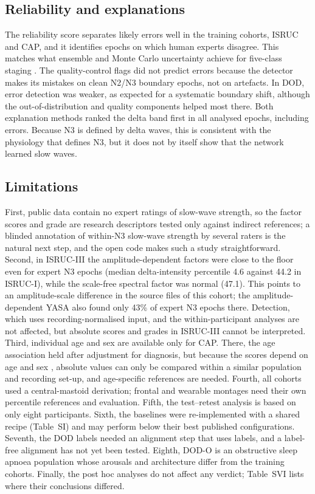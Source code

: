 \subsection{Reliability and explanations}
The reliability score separates likely errors well in the training cohorts, ISRUC and CAP, and it identifies epochs on which human experts disagree. This matches what ensemble and Monte Carlo uncertainty achieve for five-class staging \cite{dei2025sleepyland,vainikka2026uncertainty}. The quality-control flags did not predict errors because the detector makes its mistakes on clean N2/N3 boundary epochs, not on artefacts. In DOD, error detection was weaker, as expected for a systematic boundary shift, although the out-of-distribution and quality components helped most there. Both explanation methods ranked the delta band first in all analysed epochs, including errors. Because N3 is defined by delta waves, this is consistent with the physiology that defines N3, but it does not by itself show that the network learned slow waves. %

\subsection{Limitations}
\label{sec:limitations}
First, public data contain no expert ratings of slow-wave strength, so the factor scores and grade are research descriptors tested only against indirect references; a blinded annotation of within-N3 slow-wave strength by several raters is the natural next step, and the open code makes such a study straightforward. Second, in ISRUC-III the amplitude-dependent factors were close to the floor even for expert N3 epochs (median delta-intensity percentile 4.6 against 44.2 in ISRUC-I), while the scale-free spectral factor was normal (47.1). This points to an amplitude-scale difference in the source files of this cohort; the amplitude-dependent YASA also found only 43\% of expert N3 epochs there. Detection, which uses recording-normalised input, and the within-participant analyses are not affected, but absolute scores and grades in ISRUC-III cannot be interpreted. Third, individual age and sex are available only for CAP. There, the age association held after adjustment for diagnosis, but because the scores depend on age and sex \cite{davidson2025n3,rosinvil2021age}, absolute values can only be compared within a similar population and recording set-up, and age-specific references are needed. Fourth, all cohorts used a central-mastoid derivation; frontal and wearable montages need their own percentile references and evaluation. Fifth, the test--retest analysis is based on only eight participants. Sixth, the baselines were re-implemented with a shared recipe (Table~SI) and may perform below their best published configurations. Seventh, the DOD labels needed an alignment step that uses labels, and a label-free alignment has not yet been tested. Eighth, DOD-O is an obstructive sleep apnoea population whose arousals and architecture differ from the training cohorts. Finally, the post hoc analyses do not affect any verdict; Table~SVI lists where their conclusions differed. %
